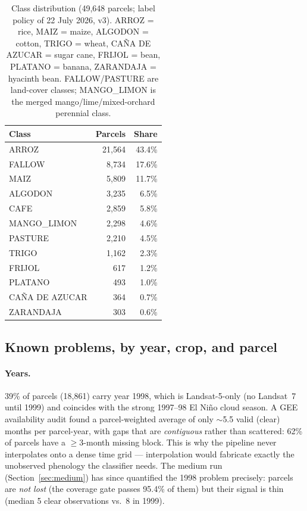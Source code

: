 \documentclass[11pt,a4paper]{article}
\begin{document}
\begin{table}[ht]
\centering\small
\caption{Class distribution (49{,}648 parcels; label policy of 22 July 2026, v3). ARROZ = rice,
MAIZ = maize, ALGODON = cotton, TRIGO = wheat, CA\~NA DE AZUCAR = sugar cane, FRIJOL = bean,
PLATANO = banana, ZARANDAJA = hyacinth bean. FALLOW/PASTURE are land-cover classes;
MANGO\_LIMON is the merged mango/lime/mixed-orchard perennial class.}
\begin{tabular}{@{}lrr@{}}
\toprule
Class & Parcels & Share \\
\midrule
ARROZ & 21{,}564 & 43.4\% \\
FALLOW & 8{,}734 & 17.6\% \\
MAIZ & 5{,}809 & 11.7\% \\
ALGODON & 3{,}235 & 6.5\% \\
CAFE & 2{,}859 & 5.8\% \\
MANGO\_LIMON & 2{,}298 & 4.6\% \\
PASTURE & 2{,}210 & 4.5\% \\
TRIGO & 1{,}162 & 2.3\% \\
FRIJOL & 617 & 1.2\% \\
PLATANO & 493 & 1.0\% \\
CA\~NA DE AZUCAR & 364 & 0.7\% \\
ZARANDAJA & 303 & 0.6\% \\
\bottomrule
\end{tabular}
\end{table}

\subsection{Known problems, by year, crop, and parcel}
\label{sec:problems}

\paragraph{Years.} 39\% of parcels (18{,}861) carry year 1998, which is Landsat-5-only (no
Landsat~7 until 1999) and coincides with the strong 1997--98 El Ni\~no cloud season. A GEE
availability audit found a parcel-weighted average of only $\sim$5.5 valid (clear) months per
parcel-year, with gaps that are \emph{contiguous} rather than scattered: 62\% of parcels have a
$\geq$3-month missing block. This is why the pipeline never interpolates onto a dense time grid
--- interpolation would fabricate exactly the unobserved phenology the classifier needs. The
medium run (Section~\ref{sec:medium}) has since quantified the 1998 problem precisely: parcels
are \emph{not lost} (the coverage gate passes 95.4\% of them) but their signal is thin (median
5 clear observations vs.\ 8 in 1999).
\end{document}
